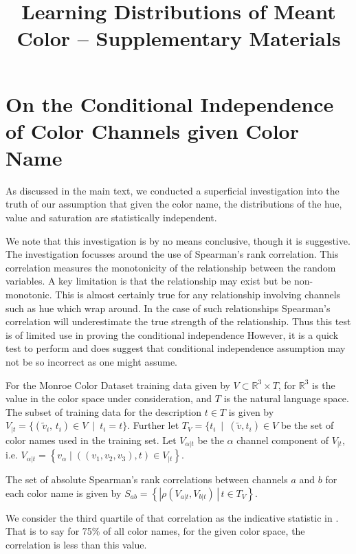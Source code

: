 \documentclass[11pt,letterpaper]{article}
\title{Learning Distributions of Meant Color -- Supplementary Materials}
\author{}
\date{}
\begin{document}

\section{On the Conditional Independence of Color Channels given Color Name}\label{sec:corrind}

As discussed in the main text, we conducted a superficial investigation into the truth of our assumption that given the color name, the distributions of the hue, value and saturation are statistically independent.

We note that this investigation is by no means conclusive, though it is suggestive.
The investigation focusses around the use of Spearman's rank correlation.
This correlation measures the monotonicity of the relationship between the random variables.
A key limitation is that the relationship may exist but be non-monotonic.
This is almost certainly true for any relationship involving channels such as hue which wrap around.
In the case of such relationships Spearman's correlation will underestimate the true strength of the relationship.
Thus this test is of limited use in proving the conditional independence
However, it is a quick test to perform and does suggest that conditional independence assumption may not be so incorrect as one might assume.


For the Monroe Color Dataset training data  given by $V \subset \mathbb{R}^{3}\times T$, for $\mathbb{R}^{3}$ is the value in the color space under consideration, and $T$ is the natural language space.
The subset of training data for the description $t \in T$ is given by
$V_{|t}=\{(\tilde{v}_i,\,t_i) \in V \: \mid \: t_{i}=t\}$.
Further let $T_V = \{t_i \: \mid \: (\tilde{v},t_i)\in V$ be the set of color names used in the training set.
Let $V_{\alpha|t}$ be the $\alpha$ channel component of $V_{|t}$, i.e. $V_{\alpha|t} = \left\lbrace v_\alpha \mid ((v_1,v_2,v_3), t) \in V_{|t} \right\rbrace$.

The set of absolute Spearman's rank correlations between channels $a$ and $b$ for each color name is given by
$S_{ab}=\left\lbrace \left|\rho(V_{a|t},V_{b|t})\,\right|\,t\in T_{V}\right\rbrace$.

We consider the third quartile of that correlation as the indicative statistic in .
That is to say for 75\% of all color names, for the given color space, the correlation is less than this value.
\end{document}
